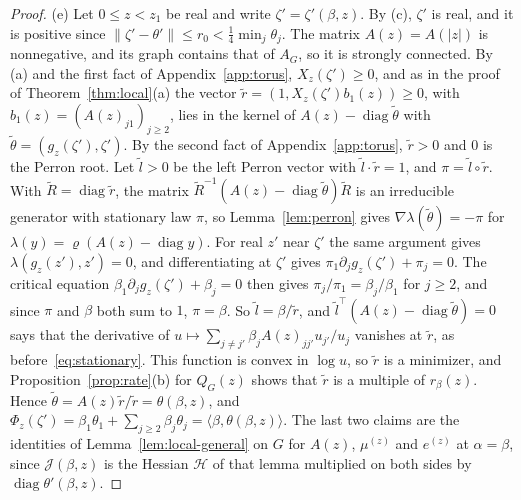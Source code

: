 \begin{proof}
(e) Let $0\le z<z_1$ be real and write $\zeta'=\zeta'(\beta,z)$. By (c), $\zeta'$ is real, and it is
positive since $\lVert\zeta'-\theta'\rVert\le r_0<\frac14\min_j\theta_j$. The matrix
$A(z)=A(|z|)$ is nonnegative, and its graph contains that of $A_G$, so it is strongly connected.
By (a) and the first fact of Appendix~\ref{app:torus}, $X_z(\zeta')\ge0$, and as in the proof of Theorem~\ref{thm:local}(a) the
vector $\tilde r=(1,X_z(\zeta')b_1(z))\ge0$, with $b_1(z)=(A(z)_{j1})_{j\ge2}$, lies in the kernel of $A(z)-\operatorname{diag}\tilde\theta$
with $\tilde\theta=(g_z(\zeta'),\zeta')$. By the second fact of Appendix~\ref{app:torus}, $\tilde r>0$ and $0$ is the Perron
root. Let $\tilde l>0$ be the left Perron vector with $\tilde l\cdot\tilde r=1$, and
$\pi=\tilde l\circ\tilde r$. With $\tilde R=\operatorname{diag}\tilde r$, the matrix
$\tilde R^{-1}(A(z)-\operatorname{diag}\tilde\theta)\tilde R$ is an irreducible generator with
stationary law $\pi$, so Lemma~\ref{lem:perron} gives $\nabla\lambda(\tilde\theta)=-\pi$ for
$\lambda(y)=\varrho(A(z)-\operatorname{diag}y)$. For real $z'$ near $\zeta'$ the same argument
gives $\lambda(g_z(z'),z')=0$, and differentiating at $\zeta'$ gives
$\pi_1\partial_jg_z(\zeta')+\pi_j=0$. The critical equation $\beta_1\partial_jg_z(\zeta')+\beta_j=0$
then gives $\pi_j/\pi_1=\beta_j/\beta_1$ for $j\ge2$, and since $\pi$ and $\beta$ both sum to $1$,
$\pi=\beta$. So $\tilde l=\beta/\tilde r$, and $\tilde l^\top(A(z)-\operatorname{diag}\tilde\theta)=0$
says that the derivative of $u\mapsto\sum_{j\ne j'}\beta_jA(z)_{jj'}u_{j'}/u_j$ vanishes at
$\tilde r$, as before~\eqref{eq:stationary}. This function is convex in $\log u$, so $\tilde r$ is
a minimizer, and Proposition~\ref{prop:rate}(b) for $Q_G(z)$ shows that $\tilde r$ is a multiple
of $r_\beta(z)$. Hence $\tilde\theta=A(z)\tilde r/\tilde r=\theta(\beta,z)$, and
$\Phi_z(\zeta')=\beta_1\theta_1+\sum_{j\ge2}\beta_j\theta_j=\langle\beta,\theta(\beta,z)\rangle$.
The last two claims are the identities of Lemma~\ref{lem:local-general} on $G$ for $A(z)$,
$\mu^{(z)}$ and $e^{(z)}$ at $\alpha=\beta$, since $\mathcal J(\beta,z)$ is the Hessian
$\mathcal H$ of that lemma multiplied on both sides by $\operatorname{diag}\theta'(\beta,z)$.
\end{proof}

